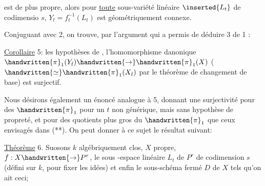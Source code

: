 est de plus propre, alors pour \uline{toute} sous-variété linéaire $\inserted{L_t}$ de codimensio $s$, $Y_t=f_t^{-1}(L_t)$ est géométriquement connexe.

Conjuguant avec 2, on trouve, par l'argument qui a permis de déduire 3 de 1 :

\uline{Corollaire} 5:  les hypothèses de  ,  l'homomorphisme danonique $\handwritten{\pi}_1(Y_{\bar t})\handwritten{\rightarrow}\handwritten{\pi}_1(X)$ ($\handwritten{\simeq}\handwritten{\pi}_1(X_{\bar t})$ par le théorème de changement de base) est surjectif.

Nous désirons également un énoncé analogue à 5, donnant une surjectivité pour des $\handwritten{\pi}_1$ pour un $t$ non générique, mais sans hypothèse de propreté, et pour des quotients plus gros du $\handwritten{\pi}_1$ que ceux envisagés dans (**). On peut donner à ce sujet le résultat suivant:

\uline{Théorème} 6. Suosons $k$ algébriquement clos,  $X$ propre, $f:X\handwritten{\rightarrow}P^r$,  le sous -espace linéaire $L_t$ de $P^r$ de codimension $s$ (défini sur $k$, pour fixer les idées)  et enfin le sous-schéma fermé $D$ de $X$ tels qu'on ait ceci; 

